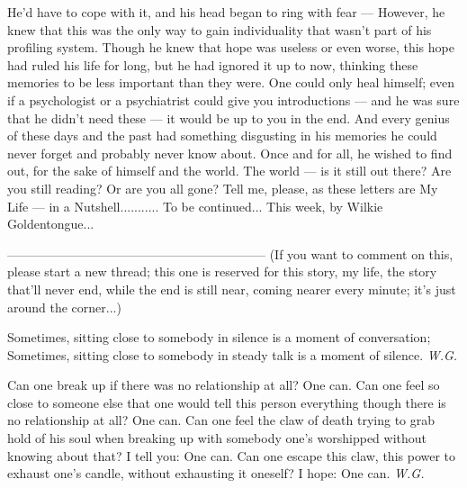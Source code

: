 He'd have to cope with it, and his head began to ring with fear --- However, he knew that this was the only way to gain individuality that wasn't part of his profiling system. 
Though he knew that hope was useless or even worse, this hope had ruled his life for long, but he had ignored it up to now, thinking these memories to be less important than they were. 
One could only heal himself; even if a psychologist or a psychiatrist could give you introductions --- and he was sure that he didn't need these --- it would be up to you in the end. 
And every genius of these days and the past had something disgusting in his memories he could never forget and probably never know about. 
Once and for all, he wished to find out, for the sake of himself and the world. 
The world --- is it still out there?
Are you still reading?
Or are you all gone?
Tell me, please, as these letters are My Life --- in a Nutshell...........
To be continued...
This week, by Wilkie Goldentongue...

--------------------------------------------------------------
(If you want to comment on this, please start a new thread; this one is reserved for this story, my life, the story that'll never end, while the end is still near, coming nearer every minute; it's just around the corner...)

Sometimes, 
sitting close to somebody in silence 
is a moment of conversation; 
Sometimes, 
sitting close to somebody in steady talk
is a moment of silence. 
\emph{W.G.}

Can one break up 
if there was no relationship at all? 
One can. 
Can one feel so close to someone else 
that one would tell this person everything 
though there is no relationship at all? 
One can. 
Can one feel the claw of death trying to grab hold of his soul 
when breaking up 
with somebody 
one's worshipped without knowing about that? 
I tell you: One can. 
Can one escape this claw, 
this power to exhaust one's candle, 
without exhausting it oneself? 
I hope: One can. 
\emph{W.G.}

